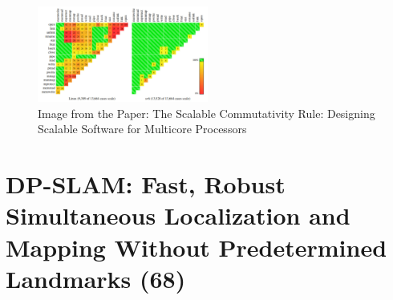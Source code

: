 \documentclass{article}
\begin{document}
\begin{figure}[hb] 
    \centering
    \includegraphics[width=0.5\textwidth]{Images/Paper44Figure.jpg}
    \caption{Image from the Paper: The Scalable Commutativity Rule: Designing Scalable Software for Multicore Processors}
\end{figure}


\section{DP-SLAM: Fast, Robust Simultaneous Localization and Mapping Without Predetermined Landmarks (68)}
\end{document}
